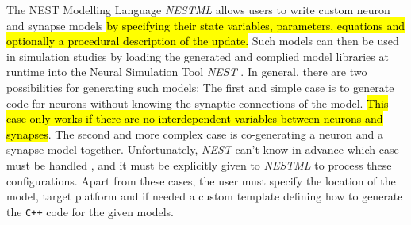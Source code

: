 The NEST Modelling Language \emph{NESTML}  allows users to write custom neuron and synapse models \hl{by specifying their state variables, parameters, equations and optionally a procedural description of the update.} Such models can then be used in simulation studies by loading the generated and complied model libraries at runtime into the Neural Simulation Tool \emph{NEST} . In general, there are two possibilities for generating such models: The first and simple case is to generate code for neurons without knowing the synaptic connections of the model. \hl{This case only works if there are no interdependent variables between neurons and synapses}. The second and more complex case is co-generating a neuron and a synapse model together. Unfortunately, \emph{NEST} can't  know in advance which case must be handled , and it must be explicitly given to \emph{NESTML} to process these configurations. Apart from these cases, the user must specify the location of the model, target platform and if needed a custom template defining how to generate the \texttt{C++} code for the given models.


